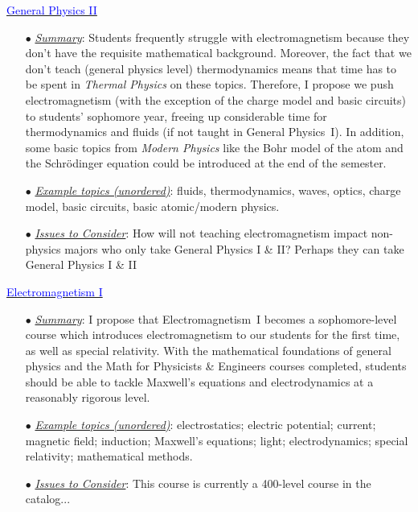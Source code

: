 \documentclass[12pt,preprint]{aastex}
\newcommand{\blue}[1]{\textcolor{blue}{#1}}
\begin{document}
\begin{itemize*}
\item{\underline{\blue{General Physics II}}
  \begin{itemize}
    \item[$\bullet$]{\underline{\em Summary}: Students frequently struggle
      with electromagnetism because they don't have the requisite mathematical
      background.  Moreover, the fact that we don't teach (general physics
      level) thermodynamics means that time has to be spent in {\em Thermal
        Physics} on these topics.  Therefore, I propose we push electromagnetism
      (with the exception of the charge model and basic circuits) to students'
      sophomore year, freeing up considerable time for thermodynamics and fluids
      (if not taught in General Physics~I).  In addition, some basic topics from
      {\em Modern Physics} like the Bohr model of the atom and the
      Schr\"{o}dinger equation could be introduced at the end of the semester.}
    \item[$\bullet$]{\underline{\em Example topics (unordered)}: fluids,
      thermodynamics, waves, optics, charge model, basic circuits, basic
      atomic/modern physics.}
    \item[$\bullet$]{\underline{\em Issues to Consider}: How will not teaching
      electromagnetism impact non-physics majors who only take General Physics I
      \& II?  Perhaps they can take General Physics I
      \& II}
  \end{itemize}
}
  
\item{\underline{\blue{Electromagnetism I}}
  \begin{itemize}
    \item[$\bullet$]{\underline{\em Summary}: I propose that Electromagnetism~I
      becomes a sophomore-level course which introduces electromagnetism to our
      students for the first time, as well as special relativity.  With the
      mathematical foundations of general physics and the Math for Physicists \&
      Engineers courses completed, students should be able to tackle Maxwell's
      equations and electrodynamics at a reasonably rigorous level.}
    \item[$\bullet$]{\underline{\em Example topics (unordered)}: electrostatics;
      electric potential; current; magnetic field; induction; Maxwell's
      equations; light; electrodynamics; special relativity; mathematical
      methods.}
    \item[$\bullet$]{\underline{\em Issues to Consider}: This course is
      currently a 400-level course in the catalog...}
  \end{itemize}
}


\end{itemize*}
\end{document}
